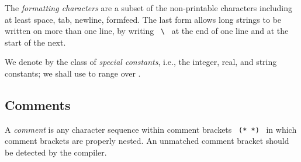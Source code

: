 \smallskip

The {\sl formatting characters} are a subset of the non-printable
            characters including at least space, tab, newline, formfeed.
The last form allows long strings to be written on more than one line, by
            writing ~\verb+\+~ at the end of one line and at the start of the
            next.\nopagebreak

We denote by {\SCon} the class of {\sl special constants}, i.e., the integer,
real, and string constants; we shall use {\scon}
to range over \SCon.

\subsection{Comments}
A {\sl comment} 
is any character sequence within comment brackets ~{\tt (* *)}~
in which
comment brackets are properly nested. An unmatched comment bracket should be
detected by the compiler.

%
